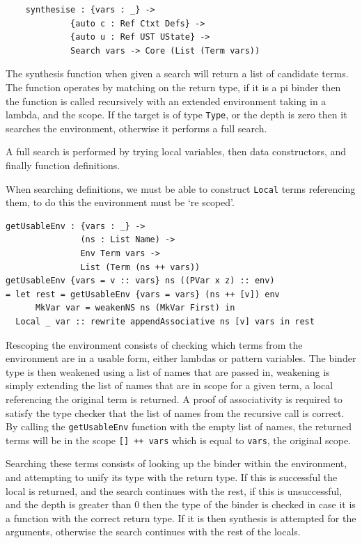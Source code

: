 \documentclass[a4paper]{article}
\begin{document}
\begin{center}
  \begin{verbatim}
    synthesise : {vars : _} -> 
             {auto c : Ref Ctxt Defs} -> 
             {auto u : Ref UST UState} ->
             Search vars -> Core (List (Term vars))
  \end{verbatim}
\end{center}

The synthesis function when given a search will return a list of
candidate terms. The function operates by matching on the return
type, if it is a pi binder then the function is called recursively
with an extended environment taking in a lambda, and the scope. If the
target is of type \texttt{Type}, or the depth is zero then it searches the environment,
otherwise it performs a full search.

A full search is performed by trying local variables, then data constructors,
and finally function definitions. 

When searching definitions, we must be able to construct \texttt{Local} terms
referencing them, to do this the environment must be `re scoped'.

\begin{center}
  \begin{verbatim}
getUsableEnv : {vars : _} -> 
               (ns : List Name) ->
               Env Term vars ->
               List (Term (ns ++ vars))
getUsableEnv {vars = v :: vars} ns ((PVar x z) :: env) 
= let rest = getUsableEnv {vars = vars} (ns ++ [v]) env 
      MkVar var = weakenNS ns (MkVar First) in 
  Local _ var :: rewrite appendAssociative ns [v] vars in rest
  \end{verbatim}
\end{center}

Rescoping the environment consists of checking which terms from the 
environment are in a usable form, either lambdas or pattern variables.
The binder type is then weakened using a list of names that are passed in,
weakening is simply extending the list of names that are in scope for
a given term, a local referencing the original term is returned. A
proof of associativity is required to satisfy the type checker that
the list of names from the recursive call is correct. By calling
the \texttt{getUsableEnv} function with the empty list of names, the returned
terms will be in the scope \texttt{[] ++ vars} which is equal to
\texttt{vars}, the original scope.

Searching these terms consists of looking up the binder within the
environment, and attempting to unify its type with the return type.
If this is successful the local is returned, and the search continues
with the rest, if this is unsuccessful, and the depth is greater than
0 then the type of the binder is checked in case it is a function with
the correct return type. If it is then synthesis is attempted for the arguments,
otherwise the search continues with the rest of the locals.
\end{document}
